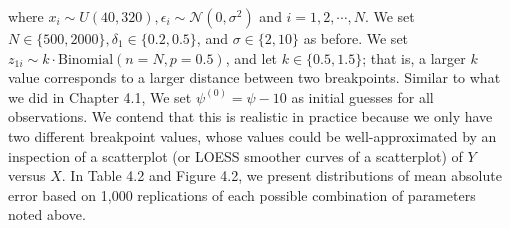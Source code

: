 \documentclass [12pt, proquest] {uwthesis}[2016/11/22]
\begin{document}
where $x_i \sim U(40, 320), \epsilon_i \sim \mathcal{N}(0, \sigma^2)$ and $i = 1, 2, \cdots, N$. We set $N \in \{500, 2000\}, \delta_1 \in \{0.2, 0.5\}$, and $\sigma \in \{2, 10\}$ as before. We set $z_{1i} \sim k \cdot \text{Binomial}(n = N, p = 0.5)$, and let $k \in \{0.5, 1.5\}$; that is, a larger $k$ value corresponds to a larger distance between two breakpoints. Similar to what we did in Chapter 4.1, We set $\psi^{(0)} = \psi - 10$ as initial guesses for all observations. We contend that this is realistic in practice because we only have two different breakpoint values, whose values could be well-approximated by an inspection of a scatterplot (or LOESS smoother curves of a scatterplot) of $Y$ versus $X$. In Table 4.2 and Figure 4.2, we present distributions of mean absolute error based on 1,000 replications of each possible combination of parameters noted above.
\end{document}
